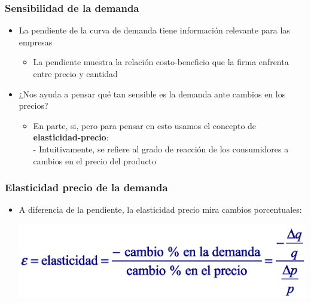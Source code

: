 \documentclass{beamer}
\begin{document}
\begin{frame}
\frametitle{ Sensibilidad de la demanda}
\begin{itemize}
    \item La pendiente de la curva de demanda tiene información relevante para las empresas
    \begin{itemize}
        \item La pendiente muestra la relación costo-beneficio que la firma enfrenta entre precio y cantidad
     \end{itemize}
    \item ¿Nos ayuda a pensar qué tan sensible es la demanda ante cambios en los precios?
    \begin{itemize}
        \item En parte, si, pero para pensar en esto usamos el concepto de \textbf{elasticidad-precio}: \\
        - Intuitivamente, se refiere al grado de reacción de los consumidores a cambios en el precio del producto 
    \end{itemize}
    \end{itemize}
\end{frame}

\begin{frame}
\frametitle{Elasticidad precio de la demanda}
\begin{itemize}
    \item A diferencia de la pendiente, la elasticidad precio mira cambios porcentuales:
    \begin{center}
    \includegraphics[scale=0.7]{Figures/Tema_06.43_elasticidadformula.png}
    \end{center}
    \end{itemize}
\end{frame}
\end{document}
